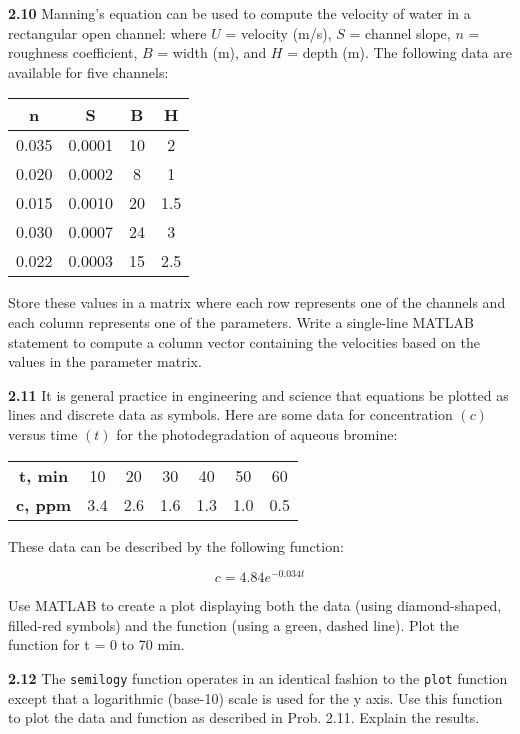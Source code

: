 \documentclass[../main.tex]{subfiles}
\begin{document}
\begin{multicols}{2}
\textbf{2.10} Manning's equation can be used to compute the velocity of water in a rectangular open channel:
where $U$ = velocity (m/s), $S$ = channel slope, $n$ = roughness
coefficient, $B$ = width (m), and $H$ = depth (m). The following data are available for five channels:


\begin{tabular}{cccc}
	\hline
	\textbf{n}&\textbf{S}&\textbf{B}&\textbf{H}\\
	\hline
		0.035 &0.0001 &10 &2\\
		0.020 &0.0002 &8 &1\\
		0.015 &0.0010 &20 &1.5\\
		0.030 &0.0007 &24 &3\\
		0.022 &0.0003 &15 &2.5\\

	\hline
\end{tabular}


Store these values in a matrix where each row represents one
of the channels and each column represents one of the parameters. Write a single-line MATLAB statement to compute a
column vector containing the velocities based on the values
in the parameter matrix.


\textbf{2.11} It is general practice in engineering and science that
equations be plotted as lines and discrete data as symbols.
Here are some data for concentration $(c)$ versus time $(t)$ for
the photodegradation of aqueous bromine:


\begin{tabular}{ccccccc}
	\hline

	\textbf{t, min} &10 &20 &30 &40 &50 &60\\
	\textbf{c, ppm} &3.4 &2.6 &1.6 &1.3 &1.0 &0.5\\

	\hline
\end{tabular}


These data can be described by the following function:

$$ c=4.84e^{-0.034t}$$

Use MATLAB to create a plot displaying both the data
(using diamond-shaped, filled-red symbols) and the function
(using a green, dashed line). Plot the function for t = 0 to
70 min.


\textbf{2.12} The \texttt{semilogy} function operates in an identical fashion
to the \texttt{plot} function except that a logarithmic (base-10) scale
is used for the y axis. Use this function to plot the data and
function as described in Prob. 2.11. Explain the results.



\end{multicols}
\end{document}
